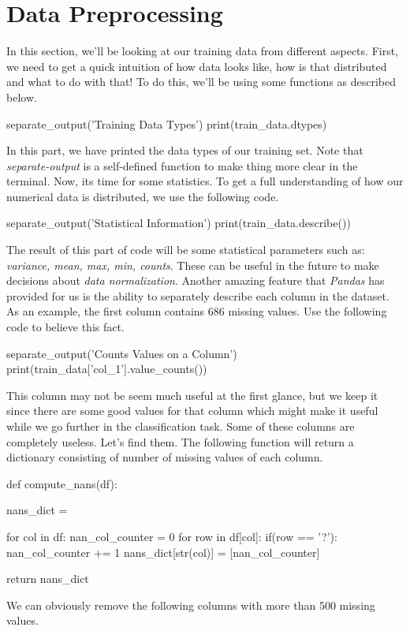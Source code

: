 \documentclass[12pt]{article}
\numberwithin{equation}{section}
\numberwithin{table}{section}
\numberwithin{figure}{section}
\begin{document}
\section{Data Preprocessing}
In this section, we'll be looking at our training data from different aspects. First, we need to get a quick intuition of how data looks like, how is that distributed and what to do with that! To do this, we'll be using some functions as described below.
\begin{python}
	separate_output('Training Data Types')
	print(train_data.dtypes)
\end{python}
In this part, we have printed the data types of our training set. Note that \textit{separate-output} is a self-defined function to make thing more clear in the terminal.
Now, its time for some statistics. To get a full understanding of how our numerical data is distributed, we use the following code.
\begin{python}
	separate_output('Statistical Information')
	print(train_data.describe())
\end{python}
The result of this part of code will be some statistical parameters such as: \textit{variance, mean, max, min, counts}. These can be useful in the future to make decisions about \textit{data normalization}.
Another amazing feature that \textit{Pandas} has provided for us is the ability to separately describe each column in the dataset. As an example, the first column contains $686$ missing values. Use the following code to believe this fact.
\begin{python}
	separate_output('Counts Values on a Column')
	print(train_data['col_1'].value_counts())
\end{python}
This column may not be seem much useful at the first glance, but we keep it since there are some good values for that column which might make it useful while we go further in the classification task.
Some of these columns are completely useless. Let's find them. The following function will return a dictionary consisting of number of missing values of each column.
\begin{python}
	def compute_nans(df):
	
	nans_dict = {}
	
	for col in df:
		nan_col_counter = 0
		for row in df[col]:
			if(row == '?'):
				nan_col_counter += 1
		nans_dict[str(col)] = [nan_col_counter]
	
	return nans_dict
\end{python}
We can obviously remove the following columns with more than 500 missing values.
\end{document}
